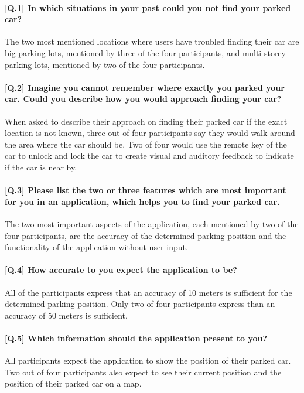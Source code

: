     
\paragraph{[Q.1] In which situations in your past could you not find your parked car?}
The two most mentioned locations where users have troubled finding their car are big parking lots, mentioned by three of the four participants, and multi-storey parking lots, mentioned by two of the four participants.

\paragraph{[Q.2] Imagine you cannot remember where exactly you parked your car. Could you describe how you would approach finding your car?}
When asked to describe their approach on finding their parked car if the exact location is not known, three out of four participants say they would walk around the area where the car should be. Two of four would use the remote key of the car to unlock and lock the car to create visual and auditory feedback to indicate if the car is near by.

\paragraph{[Q.3] Please list the two or three features which are most important for you in an application, which helps you to find your parked car.}
The two most important aspects of the application, each mentioned by two of the four participants, are the accuracy of the determined parking position and the functionality of the application without user input.

\paragraph{[Q.4] How accurate to you expect the application to be?}
All of the participants express that an accuracy of 10 meters is sufficient for the determined parking position. Only two of four participants express than an accuracy of 50 meters is sufficient.

\paragraph{[Q.5] Which information should the application present to you?}
All participants expect the application to show the position of their parked car. Two out of four participants also expect to see their current position and the position of their parked car on a map. 

